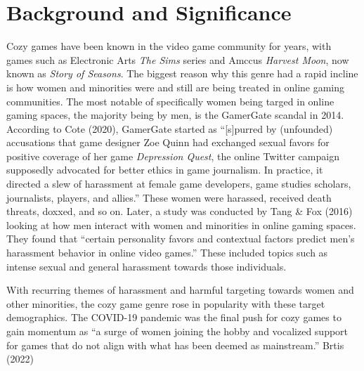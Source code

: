 \documentclass[
  12pt,
  letterpaper,
  DIV=11,
  numbers=noendperiod]{scrreprt}
\begin{document}
\section{Background and Significance}\label{background-and-significance}

Cozy games have been known in the video game community for years, with
games such as Electronic Arts \emph{The Sims} series and Amccus
\emph{Harvest Moon}, now known as \emph{Story of Seasons}. The biggest
reason why this genre had a rapid incline is how women and minorities
were and still are being treated in online gaming communities. The most
notable of specifically women being targed in online gaming spaces, the
majority being by men, is the GamerGate scandal in 2014. According to
Cote (2020), GamerGate started as ``{[}s{]}purred by (unfounded)
accusations that game designer Zoe Quinn had exchanged sexual favors for
positive coverage of her game \emph{Depression Quest}, the online
Twitter campaign supposedly advocated for better ethics in game
journalism. In practice, it directed a slew of harassment at female game
developers, game studies scholars, journalists, players, and allies.''
These women were harassed, received death threats, doxxed, and so on.
Later, a study was conducted by Tang \& Fox (2016) looking at how men
interact with women and minorities in online gaming spaces. They found
that ``certain personality favors and contextual factors predict men's
harassment behavior in online video games.'' These included topics such
as intense sexual and general harassment towards those individuals.

With recurring themes of harassment and harmful targeting towards women
and other minorities, the cozy game genre rose in popularity with these
target demographics. The COVID-19 pandemic was the final push for cozy
games to gain momentum as ``a surge of women joining the hobby and
vocalized support for games that do not align with what has been deemed
as mainstream.'' Brtis (2022)
\end{document}
